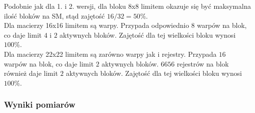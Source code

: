 Podobnie jak dla 1. i 2. wersji, dla bloku 8x8 limitem okazuje się być maksymalna ilość bloków na SM, stąd zajętość $ 16 / 32 = 50\% $. \\
Dla macierzy 16x16 limitem są warpy. Przypada odpowiednio $ 8 $ warpów na blok, co daje limit $ 4 $ i $ 2 $ aktywnych bloków. Zajętość dla tej wielkości bloku wynosi $ 100\% $. \\
Dla macierzy 22x22 limitem są zarówno warpy jak i rejestry. Przypada $ 16 $ warpów na blok, co daje limit $ 2 $ aktywnych bloków. $ 6656 $ rejestrów na blok również daje limit $ 2 $ aktywnych bloków. Zajętość dla tej wielkości bloku wynosi $ 100\% $.

\subsubsection{Wyniki pomiarów}

